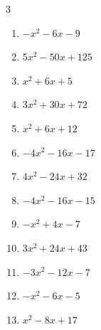 \begin{multicols}{3}
\begin{enumerate}

  \item $-x^{2}-6x-9$


  \item $5x^{2}-50x+125$


\columnbreak %

  \item $x^{2}+6x+5$


  \item $3x^{2}+30x+72$


  \item $x^{2}+6x+12$


  \item $-4x^{2}-16x-17$


  \item $4x^{2}-24x+32$


  \item $-4x^{2}-16x-15$


  \item $-x^{2}+4x-7$


  \item $3x^{2}+24x+43$


  \item $-3x^{2}-12x-7$


  \item $-x^{2}-6x-5$


\columnbreak %

\resetques

  \item $x^{2}-8x+17$


\end{enumerate}
\end{multicols}
